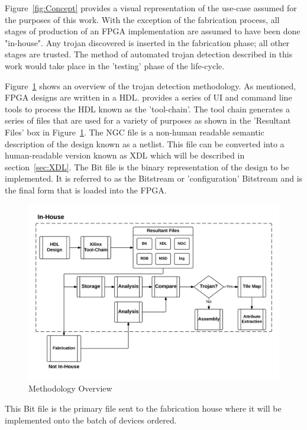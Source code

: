 Figure~\ref{fig:Concept} provides a visual representation of the use-case assumed for the purposes of this work. 
With the exception of the fabrication process, all stages of production of an \acrshort{FPGA} implementation are assumed to have been done "in-house". 
Any trojan discovered is inserted in the fabrication phase; all other stages are trusted.  
The method of automated trojan detection described in this work would take place in the 'testing' phase of the life-cycle. 

Figure~\ref{fig:methodologyOverview} shows an overview of the trojan detection methodology.
As mentioned, \acrshort{FPGA} designs are written in a \acrfull{HDL}.
\Xilinx provides a series of \acrfull{UI} and command line tools to process the \acrshort{HDL} known as the 'tool-chain'.
The tool chain generates a series of files that are used for a variety of purposes as shown in the 'Resultant Files' box in Figure~\ref{fig:methodologyOverview}.
The NGC file is a non-human readable semantic description of the design known as a netlist.
This file can be converted into a human-readable version known as \acrfull{XDL} which will be described in section~\ref{sec:XDL}.
The Bit file is the binary representation of the design to be implemented.
It is referred to as the \gls{Bitstream} or 'configuration' \gls{Bitstream} and is the final form that is loaded into the \acrshort{FPGA}.
\begin{figure}
	\centering
	\includegraphics[width=1\linewidth]{Figures/methodologyOverview}
	\caption[Methodology Overview]{Methodology Overview}
	\label{fig:methodologyOverview}
\end{figure}
This Bit file is the primary file sent to the fabrication house where it will be implemented onto the batch of devices ordered.
